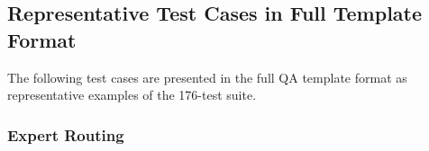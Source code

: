 \documentclass{FastFyp}
\begin{document}
\subsection{Representative Test Cases in Full Template Format}
The following test cases are presented in the full QA template format as representative examples of the 176-test suite.

\FloatBarrier
\clearpage
\subsubsection{Expert Routing}
\providecommand{\tcW}{\dimexpr\textwidth-8\tabcolsep-5\arrayrulewidth\relax}
\providecommand{\tcA}{\dimexpr\tcW*21/100\relax}
\providecommand{\tcB}{\dimexpr\tcW*23/100\relax}
\providecommand{\tcC}{\dimexpr\tcW*20/100\relax}
\providecommand{\tcD}{\dimexpr\tcW*36/100\relax}
\providecommand{\tcSpanBC}{\dimexpr\tcB+\tcC+2\tabcolsep+\arrayrulewidth\relax}
\providecommand{\tcSpanBCD}{\dimexpr\tcB+\tcC+\tcD+4\tabcolsep+2\arrayrulewidth\relax}
\providecommand{\tcSpanAll}{\dimexpr\tcA+\tcB+\tcC+\tcD+6\tabcolsep+3\arrayrulewidth\relax}
\end{document}
